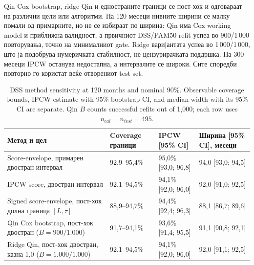 \documentclass[12pt]{article}
\begin{document}
Qin Cox bootstrap, ridge Qin и едностраните граници се пост-хок и одговараат на
различни цели или алгоритми. На 120 месеци нивните ширини се малку помали од
примарните, но не се избираат по ширина: Qin има Cox working model и приближна
валидност, а првичниот DSS/PAM50 refit успеа во 900/1\,000 повторувања, точно на
минималниот gate. Ridge варијантата успеа во 1\,000/1\,000, што ја подобрува
нумеричката стабилност, не цензурирачката поддршка. На 300 месеци IPCW останува
недостапна, а интервалите се широки. Сите споредби повторно го користат веќе
отворениот test set.

\begin{table}[ht]
\centering
\caption{DSS method sensitivity at 120 months and nominal 90\%. Observable coverage bounds, IPCW estimate with 95\% bootstrap CI, and median width with its 95\% CI are separate. Qin $B$ counts successful refits out of 1,000; each row uses $n_{cal}=n_{test}=495$.}
\label{tab:dss-method-sensitivities}
\footnotesize
\setlength{\tabcolsep}{3pt}
\begin{tabular}{p{}p{}p{}p{}}
\hline
Метод и цел & Coverage граници & IPCW [95\% CI] & Ширина [95\% CI], месеци \\
\hline
Score-envelope, примарен двостран интервал & 92,9--95,4\% & 95,0\% [93,0; 96,8] & 94,0 [93,0; 94,5] \\
IPCW score, двостран интервал & 92,1--94,5\% & 94,1\% [92,0; 96,0] & 92,0 [91,0; 92,5] \\
Signed score-envelope, пост-хок долна граница $[L,\tau]$ & 88,9--94,7\% & 94,4\% [92,4; 96,3] & 88,1 [86,7; 89,6] \\
Qin Cox bootstrap, пост-хок двостран ($B=900/1.000$) & 91,7--94,1\% & 93,6\% [91,4; 95,5] & 91,1 [90,8; 92,1] \\
Ridge Qin, пост-хок двостран, казна 1,0 ($B=1.000/1.000$) & 92,1--94,5\% & 94,1\% [92,0; 96,0] & 92,0 [91,1; 92,5] \\
\hline
\end{tabular}
\end{table}
\end{document}
